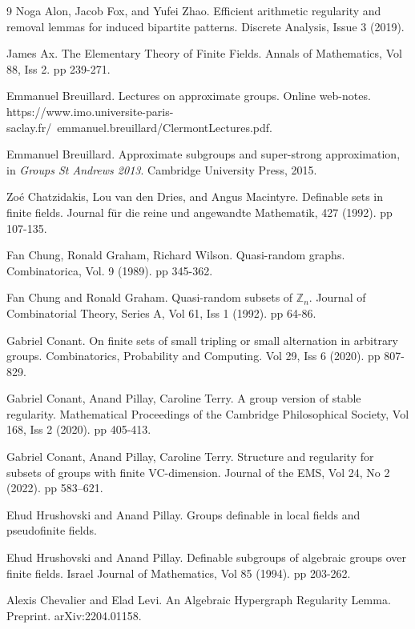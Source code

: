 \documentclass[10pt]{article}
\begin{document}
\begin{thebibliography}{9}
Noga Alon, Jacob Fox, and Yufei Zhao. Efficient arithmetic regularity and removal lemmas for induced bipartite patterns. Discrete Analysis, Issue 3 (2019).

James Ax. The Elementary Theory of Finite Fields. Annals of Mathematics, Vol 88, Iss 2. pp 239-271.

Emmanuel Breuillard. Lectures on approximate groups. Online web-notes. https://www.imo.universite-paris-saclay.fr/~emmanuel.breuillard/ClermontLectures.pdf.

Emmanuel Breuillard. Approximate subgroups and super-strong approximation, in \textit{Groups St Andrews 2013}. Cambridge University Press, 2015. 

Zoé Chatzidakis, Lou van den Dries, and Angus Macintyre. Definable sets in finite fields. Journal für die reine und angewandte Mathematik, 427 (1992). pp 107-135.

Fan Chung, Ronald Graham, Richard Wilson. Quasi-random graphs. Combinatorica, Vol. 9 (1989). pp 345-362.

Fan Chung and Ronald Graham. Quasi-random subsets of $\mathbb{Z}_n$. Journal of Combinatorial Theory, Series A, Vol 61, Iss 1 (1992). pp 64-86.

Gabriel Conant. On finite sets of small tripling or small alternation in arbitrary groups. Combinatorics, Probability and Computing. Vol 29, Iss 6 (2020). pp 807-829.

Gabriel Conant, Anand Pillay, Caroline Terry. A group version of stable regularity. Mathematical Proceedings of the Cambridge Philosophical Society, Vol 168, Iss 2 (2020). pp 405-413.

Gabriel Conant, Anand Pillay, Caroline Terry. Structure and regularity for subsets of groups with finite VC-dimension. Journal of the EMS, Vol 24, No 2 (2022). pp 583–621.

Ehud Hrushovski and Anand Pillay. Groups definable in local fields and pseudofinite fields.

Ehud Hrushovski and Anand Pillay. Definable subgroups of algebraic groups over finite fields. Israel Journal of Mathematics, Vol 85 (1994). pp 203-262.

Alexis Chevalier and Elad Levi. An Algebraic Hypergraph Regularity Lemma. Preprint. arXiv:2204.01158.


\end{thebibliography}
\end{document}
